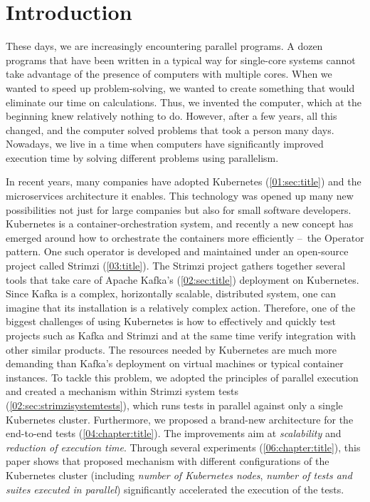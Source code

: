 \chapter{Introduction}

These days, we are increasingly encountering parallel programs.
A dozen programs that have been written in a typical way for single-core systems cannot take advantage of the presence of computers with multiple cores.
When we wanted to speed up problem-solving, we wanted to create something that would eliminate our time on calculations.
Thus, we invented the computer, which at the beginning knew relatively nothing to do.
However, after a few years, all this changed, and the computer solved problems that took a person many days.
Nowadays, we live in a time when computers have significantly improved execution time by solving different problems using parallelism.

In recent years, many companies have adopted Kubernetes (\ref{01:sec:title}) and the microservices architecture it enables.
This technology was opened up many new possibilities not just for large companies but also for small software developers.
Kubernetes is a container-orchestration system, and recently a new concept has emerged around how to orchestrate the containers more efficiently \---\ the Operator pattern.
One such operator is developed and maintained under an open-source project called Strimzi (\ref{03:title}).
The Strimzi project gathers together several tools that take care of Apache Kafka's (\ref{02:sec:title}) deployment on Kubernetes.
Since Kafka is a complex, horizontally scalable, distributed system, one can imagine that its installation is a relatively complex action.
Therefore, one of the biggest challenges of using Kubernetes is how to effectively and quickly test projects such as Kafka and Strimzi and at the same time verify integration with other similar products.
The resources needed by Kubernetes are much more demanding than Kafka's deployment on virtual machines or typical container instances.
To tackle this problem, we adopted the principles of parallel execution and created a mechanism within Strimzi system tests (\ref{02:sec:strimzisystemtests}), which runs tests in parallel against only a single Kubernetes cluster.
Furthermore, we proposed a brand-new architecture for the end-to-end tests (\ref{04:chapter:title}).
The improvements aim at \textit{scalability} and \textit{reduction of execution time}.
Through several experiments (\ref{06:chapter:title}), this paper shows that proposed mechanism with different configurations of the Kubernetes cluster (including \textit{number of Kubernetes nodes}, \textit{number of tests and suites executed in parallel}) significantly accelerated the execution of the tests.

